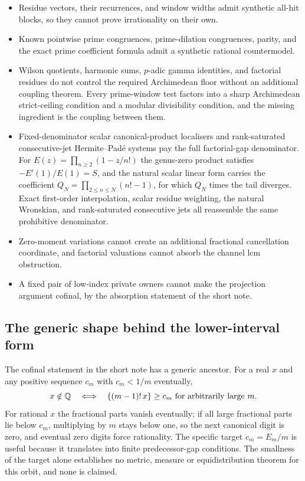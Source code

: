 \documentclass[11pt]{article}
\newcommand{\Ser}{S}
\begin{document}
\begin{itemize}
\item Residue vectors, their recurrences, and window widths admit synthetic
  all-hit blocks, so they cannot prove irrationality on their own.
\item Known pointwise prime congruences, prime-dilation congruences, parity,
  and the exact prime coefficient formula admit a synthetic rational
  countermodel.
\item Wilson quotients, harmonic sums, $p$-adic gamma identities, and
  factorial residues do not control the required Archimedean floor without an
  additional coupling theorem.  Every prime-window test factors into a sharp
  Archimedean strict-ceiling condition and a modular divisibility condition,
  and the missing ingredient is the coupling between them.
\item Fixed-denominator scalar canonical-product localisers and
  rank-saturated consecutive-jet Hermite--Pad\'e systems pay the full
  factorial-gap denominator.  For $E(z)=\prod_{n\ge2}(1-z/n!)$ the genus-zero
  product satisfies $-E'(1)/E(1)=\Ser$, and the natural scalar linear form
  carries the coefficient $Q_N=\prod_{2\le n\le N}(n!-1)$, for which $Q_N$
  times the tail diverges.  Exact first-order interpolation, scalar residue
  weighting, the natural Wronskian, and rank-saturated consecutive jets all
  reassemble the same prohibitive denominator.
\item Zero-moment variations cannot create an additional fractional
  cancellation coordinate, and factorial valuations cannot absorb the channel
  lcm obstruction.
\item A fixed pair of low-index private owners cannot make the projection
  argument cofinal, by the absorption statement of the short note.
\end{itemize}

\subsection{The generic shape behind the lower-interval form}
\label{long68:sec:ext-generic}

The cofinal statement in the short note has a generic ancestor.  For a real
$x$ and any positive sequence $c_m$ with $c_m<1/m$ eventually,
\[
 x\notin\mathbb{Q}
 \quad\Longleftrightarrow\quad
 \{(m-1)!\,x\}\ge c_m\ \hbox{for arbitrarily large }m .
\]
For rational $x$ the fractional parts vanish eventually; if all large
fractional parts lie below $c_m$, multiplying by $m$ stays below one, so the
next canonical digit is zero, and eventual zero digits force rationality.
The specific target $c_m=E_m/m$ is useful because it translates into finite
predecessor-gap conditions.  The smallness of the target alone establishes no
metric, measure or equidistribution theorem for this orbit, and none is
claimed.
\end{document}
